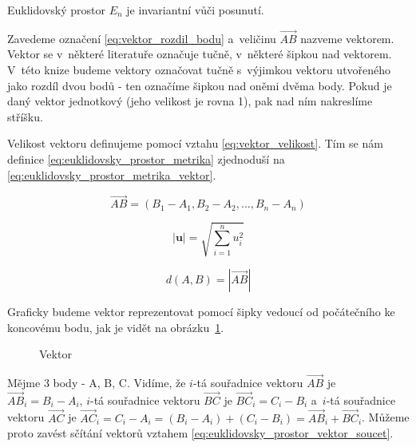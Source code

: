 \documentclass{book}
\newcommand{\vect}[1]{\boldsymbol{#1}}
\newcommand{\vectpoints}[1]{\overrightarrow{#1}}
\begin{document}
\begin{fact}
Euklidovský prostor \(E_n\) je invariantní vůči posunutí.
\end{fact}

Zavedeme označení
\eqref{eq:vektor_rozdil_bodu} a~veličinu \(\vectpoints{AB}\) nazveme vektorem. Vektor se v~některé literatuře označuje tučně, v~některé šipkou nad vektorem. V~této knize budeme vektory označovat tučně s~výjimkou vektoru
utvořeného jako rozdíl dvou bodů - ten označíme šipkou nad oněmi dvěma body. Pokud je daný vektor jednotkový (jeho velikost je rovna 1), pak nad ním
nakreslíme stříšku.

Velikost vektoru definujeme pomocí vztahu \eqref{eq:vektor_velikost}. Tím se nám definice \eqref{eq:euklidovsky_prostor_metrika} zjednoduší na \eqref{eq:euklidovsky_prostor_metrika_vektor}.

\begin{equation}
\label{eq:vektor_rozdil_bodu}
\vectpoints{AB} = (B_1 - A_1, B_2 - A_2, ..., B_n - A_n)
\end{equation}

\begin{equation}
\label{eq:vektor_velikost}
|\vect{u}| = \sqrt{\sum_{i=1}^{n} u_i^2}
\end{equation}

\begin{equation}
\label{eq:euklidovsky_prostor_metrika_vektor}
d(A, B) = |\vectpoints{AB}|
\end{equation}

Graficky budeme vektor reprezentovat pomocí šipky vedoucí od počátečního ke koncovému bodu, jak je vidět na obrázku~\ref{img:vektor_graficky}.

\begin{figure}[!h]
\centering
{}
\caption{Vektor}
\label{img:vektor_graficky}
\end{figure}

Mějme 3 body - A, B, C. Vidíme, že \(i\)-tá souřadnice vektoru \(\vectpoints{AB}\) je \(\vectpoints{AB}_i = B_i - A_i\), \(i\)-tá souřadnice vektoru \(\vectpoints{BC}\) je \(\vectpoints{BC}_i = C_i - B_i\) a~\(i\)-tá souřadnice vektoru \(\vectpoints{AC}\) je \(\vectpoints{AC}_i = C_i - A_i = (B_i - A_i) + (C_i - B_i) = \vectpoints{AB}_i + \vectpoints{BC}_i\). Můžeme proto zavést sčítání vektorů vztahem \eqref{eq:euklidovsky_prostor_vektor_soucet}.
\end{document}
